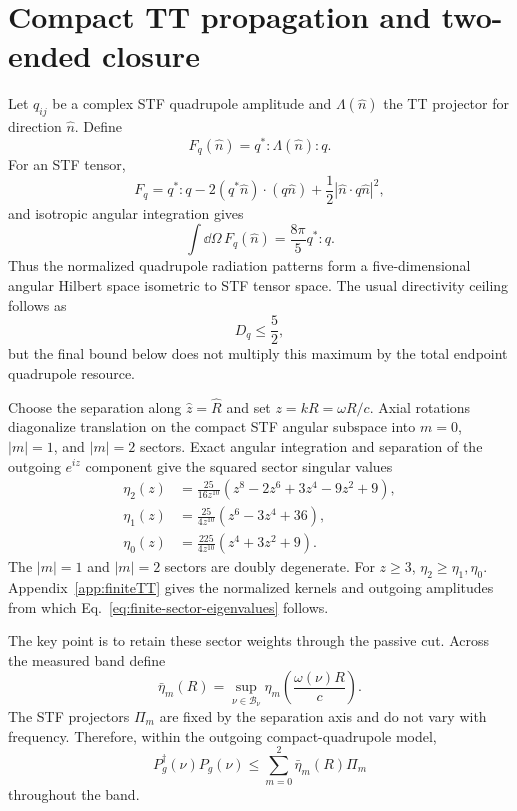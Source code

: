 \section{Compact TT propagation and two-ended closure}
\label{sec:propagation}

Let $q_{ij}$ be a complex STF quadrupole amplitude and $\Lambda(\hat n)$ the TT projector for direction $\hat n$. Define
\begin{equation}
F_q(\hat n)=q^*:\Lambda(\hat n):q .
\end{equation}
For an STF tensor,
\begin{equation}
F_q=q^*:q-2(q^*\hat n)\cdot(q\hat n)
+\frac12|\hat n\cdot q\hat n|^2,
\end{equation}
and isotropic angular integration gives
\begin{equation}
\int\dd\Omega\,F_q(\hat n)=\frac{8\pi}{5}q^*:q .
\label{eq:Fint}
\end{equation}
Thus the normalized quadrupole radiation patterns form a five-dimensional angular Hilbert space isometric to STF tensor space. The usual directivity ceiling follows as
\begin{equation}
D_q\le\frac52,
\end{equation}
but the final bound below does not multiply this maximum by the total endpoint quadrupole resource.

Choose the separation along $\hat z=\hat R$ and set $z=kR=\omega R/c$. Axial rotations diagonalize translation on the compact STF angular subspace into $m=0$, $|m|=1$, and $|m|=2$ sectors. Exact angular integration and separation of the outgoing $e^{iz}$ component give the squared sector singular values
\begin{align}
\eta_2(z)
&=\frac{25}{16z^{10}}
\left(z^8-2z^6+3z^4-9z^2+9\right),\\
\eta_1(z)
&=\frac{25}{4z^{10}}
\left(z^6-3z^4+36\right),\\
\eta_0(z)
&=\frac{225}{4z^{10}}
\left(z^4+3z^2+9\right).
\label{eq:finite-sector-eigenvalues}
\end{align}
The $|m|=1$ and $|m|=2$ sectors are doubly degenerate. For $z\ge3$, $\eta_2\ge\eta_1,\eta_0$. Appendix~\ref{app:finiteTT} gives the normalized kernels and outgoing amplitudes from which Eq.~\eqref{eq:finite-sector-eigenvalues} follows.

The key point is to retain these sector weights through the passive cut. Across the measured band define
\begin{equation}
\bar\eta_m(R)
=\sup_{\nu\in\mathcal B_\nu}
\eta_m\!\left(\frac{\omega(\nu)R}{c}\right).
\label{eq:etamaxband}
\end{equation}
The STF projectors $\Pi_m$ are fixed by the separation axis and do not vary with frequency. Therefore, within the outgoing compact-quadrupole model,
\begin{equation}
P_g^\dagger(\nu)P_g(\nu)
\le
\sum_{m=0}^{2}\bar\eta_m(R)\Pi_m
\end{equation}
throughout the band.

